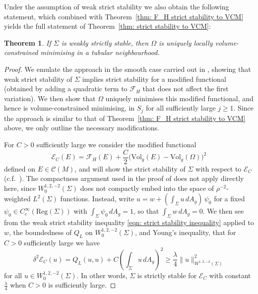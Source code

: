 \documentclass[12pt]{article}
\newtheorem{theorem}{Theorem}
\begin{document}
Under the assumption of weak strict stability we also obtain the following statement, which combined with Theorem~\ref{thm: F_H strict stability to VCM} yields the full statement of Theorem~\ref{thm: strict stability to VCM}:


\begin{theorem}\label{thm: weak strictly stable to VCM}
    If $\Sigma$ is weakly strictly stable, then $\Omega$ is uniquely locally volume-constrained minimising in a tubular neighbourhood.
\end{theorem}


\begin{proof}
We emulate the approach in the smooth case carried out in \cite{G96}, showing that weak strict stability of $\Sigma$ implies strict stability for a modified functional (obtained by adding a quadratic term to $\mathcal{F}_H$ that does not affect the first variation). We then show that $\Omega$ uniquely minimises this modified functional, and hence is volume-constrained minimising, in $S_j$ for all sufficiently large $j \geq 1$. Since the approach is similar to that of Theorem~\ref{thm: F_H strict stability to VCM} above, we only outline the necessary modifications.

\bigskip

For $C > 0$ sufficiently large we consider the modified functional
$$\mathcal{E}_C(E) = \mathcal{F}_H(E) + 
\frac{C}{2}\bigl(\mathrm{Vol}_g(E)-\mathrm{Vol}_g(\Omega)\bigr)^2$$
defined on $E \in \mathcal{C}(M)$, and will show the strict stability of $\Sigma$ with respect to $\mathcal{E}_C$ (c.f.~\cite[Lemma 5]{G96}). The compactness argument used in the proof of \cite[Lemma 5]{G96} does not apply directly here, since $W^{1,2,-2}_0(\Sigma)$ does not compactly embed into the space of $\rho^{-2}$-weighted $L^2(\Sigma)$ functions. Instead, write $u=w+(\int_\Sigma u \, dA_g)\,\psi_0$ for a fixed $\psi_0\in C^\infty_c(\mathrm{Reg}(\Sigma))$ with $\int_\Sigma\psi_0 \, dA_g = 1$, so that $\int_\Sigma w \, dA_g = 0$. We then see from the weak strict stability inequality \eqref{eqn: strict stability inequality} applied to $w$, the boundedness of $Q_L$ on $W^{1,2,-2}_0(\Sigma)$, and Young's inequality, that for $C > 0$ sufficiently large we have
$$
\delta^2 \mathcal{E}_C(u) = Q_L(u,u) + C\left(\int_\Sigma u \, dA_g\right)^2  \geq \frac{\lambda}{4}\|u\|_{W^{1,2,-2}(\Sigma)}^2$$
for all $u\in W^{1,2,-2}_0(\Sigma)$. In other words, $\Sigma$ is strictly stable for $\mathcal{E}_C$ with constant $\frac{\lambda}{4}$ when $C > 0$ is sufficiently large.


\end{proof}
\end{document}
